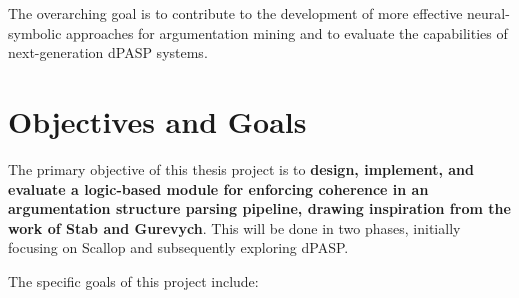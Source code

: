 \documentclass{article}
\begin{document}
The overarching goal is to contribute to the development of more effective
neural-symbolic approaches for argumentation mining and to evaluate the
capabilities of next-generation dPASP systems.

\section{Objectives and Goals}

The primary objective of this thesis project is to \textbf{design, implement,
and evaluate a logic-based module for enforcing coherence in an argumentation
structure parsing pipeline, drawing inspiration from the work of Stab and
Gurevych}. This will be done in two phases, initially focusing on Scallop and
subsequently exploring dPASP.

The specific goals of this project include:
\end{document}
